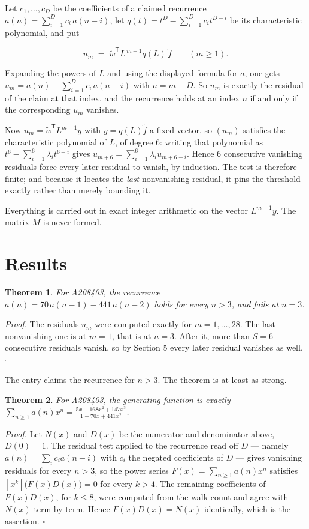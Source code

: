 \documentclass[11pt]{article}
\newtheorem{theorem}{Theorem}
\theoremstyle{definition}
\begin{document}
Let $c_1,\dots,c_D$ be the coefficients of a claimed recurrence $a(n) = \sum_{i=1}^{D} c_i\,a(n-i)$, let $q(t) = t^{D} - \sum_{i=1}^{D} c_i t^{D-i}$ be its characteristic polynomial, and put

\[u_m \;=\; \tilde w^{\mathsf T} L^{\,m-1} q(L)\,\tilde f \qquad (m \ge 1).\]

Expanding the powers of $L$ and using the displayed formula for $a$, one gets $u_m = a(n) - \sum_{i=1}^{D} c_i\,a(n-i)$ with $n = m + D$. So $u_m$ is exactly the residual of the claim at that index, and the recurrence holds at an index $n$ if and only if the corresponding $u_m$ vanishes.

Now $u_m = \tilde w^{\mathsf T} L^{m-1} y$ with $y = q(L)\tilde f$ a fixed vector, so $(u_m)$ satisfies the characteristic polynomial of $L$, of degree $6$: writing that polynomial as $t^{6} - \sum_{i=1}^{6} \lambda_i t^{6-i}$ gives $u_{m+6} = \sum_{i=1}^{6} \lambda_i u_{m+6-i}$. Hence $6$ consecutive vanishing residuals force every later residual to vanish, by induction. The test is therefore finite; and because it locates the {\itshape last} nonvanishing residual, it pins the threshold exactly rather than merely bounding it.

Everything is carried out in exact integer arithmetic on the vector $L^{m-1}y$. The matrix $M$ is never formed.

\section{Results}

\begin{theorem} For A208403, the recurrence $a(n) = 70\,a(n-1) - 441\,a(n-2)$ holds for every $n > 3$, and fails at $n = 3$.\end{theorem}

{\itshape Proof.} The residuals $u_m$ were computed exactly for $m = 1,\dots,28$. The last nonvanishing one is at $m = 1$, that is at $n = 3$. After it, more than $S = 6$ consecutive residuals vanish, so by Section 5 every later residual vanishes as well. $\square$

The entry claims the recurrence for $n > 3$. The theorem is at least as strong.

\begin{theorem} For A208403, the generating function is exactly $\sum_{n\ge 1} a(n)x^n = \frac{5x - 168x^{2} + 147x^{3}}{1 - 70x + 441x^{2}}$.\end{theorem}

{\itshape Proof.} Let $N(x)$ and $D(x)$ be the numerator and denominator above, $D(0)=1$. The residual test applied to the recurrence read off $D$ --- namely $a(n) = \sum_i c_i a(n-i)$ with $c_i$ the negated coefficients of $D$ --- gives vanishing residuals for every $n > 3$, so the power series $F(x)=\sum_{n\ge 1}a(n)x^n$ satisfies $[x^k]\bigl(F(x)D(x)\bigr) = 0$ for every $k > 4$. The remaining coefficients of $F(x)D(x)$, for $k \le 8$, were computed from the walk count and agree with $N(x)$ term by term. Hence $F(x)D(x) = N(x)$ identically, which is the assertion. $\square$
\end{document}
